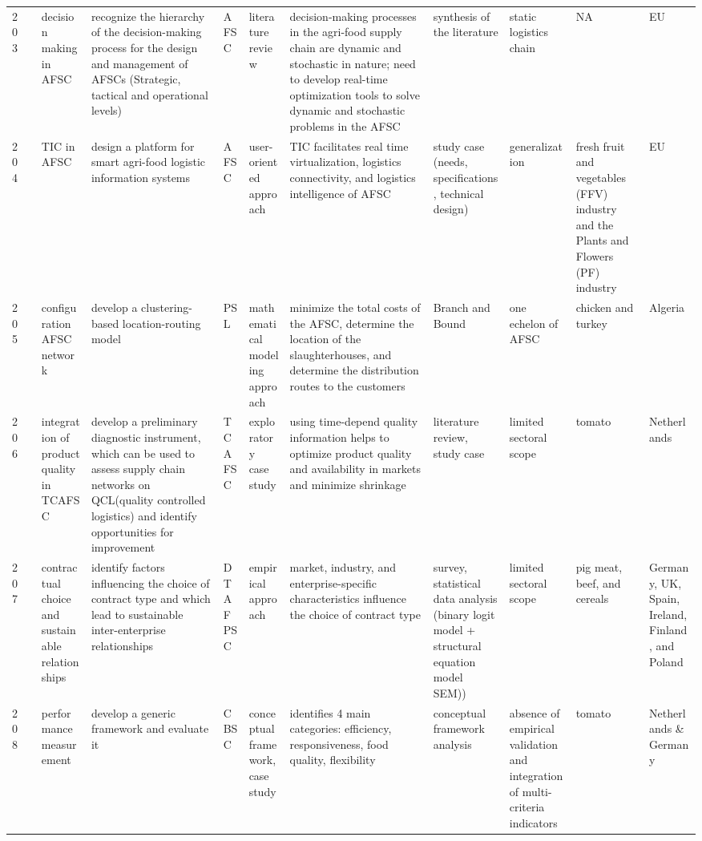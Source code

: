 \documentclass[a4paper,10pt]{article}
\begin{document}
\begin{landscape}
\begin{small}
\begin{longtable}{p{0.5cm} p{2cm} p{2.5cm} p{4cm} p{1cm} p{2.5cm} p{5.5cm} p{2.5cm} p{2.5cm} p{1.8cm} p{1.5cm}}
203 & \textcite{Tsolakis207} &decision making in AFSC & recognize the hierarchy of the decision-making process for the design and management of AFSCs (Strategic, tactical and operational levels)&AFSC & literature review& decision-making processes in the agri-food supply chain are dynamic and stochastic in nature; need to develop real-time optimization tools to solve dynamic and stochastic problems in the AFSC &synthesis of the literature   & static logistics chain& NA& EU  \\
204 & \textcite{Verdouw210} &TIC in AFSC &design a platform for smart agri-food logistic information systems &AFSC & user-oriented approach& TIC facilitates real time virtualization, logistics connectivity, and logistics intelligence of AFSC &study case (needs, specifications, technical design)   & generalization& fresh fruit and vegetables (FFV) industry and the Plants and Flowers (PF) industry& EU  \\
205 & \textcite{Boudahri211} &configuration AFSC network & develop a clustering-based location-routing model &PSL & mathematical modeling approach& minimize the total costs of the AFSC, determine the location of the slaughterhouses, and determine the distribution routes to the customers &Branch and Bound   &one echelon of AFSC& chicken and turkey& Algeria  \\
206 & \textcite{van213} &integration of product quality in TCAFSC & develop a preliminary diagnostic instrument, which can be used to assess supply chain networks on QCL(quality controlled logistics) and identify opportunities for improvement&TCAFSC & exploratory case study& using time-depend quality information helps to optimize product quality and availability in markets and minimize shrinkage &literature review, study case   & limited sectoral scope& tomato& Netherlands  \\
207 & \textcite{Fischer214} &contractual choice and sustainable relationships  &identify factors influencing the choice of contract type and which lead to sustainable inter-enterprise relationships&DTAFPSC & empirical approach& market, industry, and enterprise-specific characteristics influence the choice of contract type &survey, statistical data analysis (binary logit model + structural equation model SEM))  & limited sectoral scope& pig meat, beef, and cereals& Germany, UK, Spain, Ireland, Finland, and Poland  \\
208 & \textcite{aramyan217} & performance measurement & develop a generic framework and evaluate it & CBSC & conceptual framework, case study & identifies 4 main categories: efficiency, responsiveness, food quality, flexibility &conceptual framework analysis &absence of empirical validation and integration of multi-criteria indicators & tomato & Netherlands \& Germany \\

\end{longtable}
\end{small}
\end{landscape}
\end{document}
